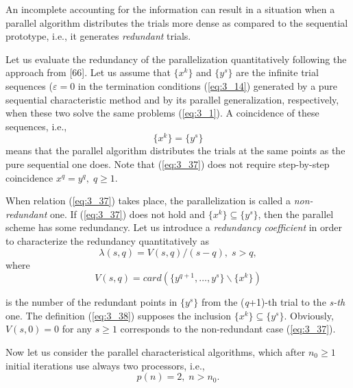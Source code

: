 	An incomplete accounting for the information can result in a situation when a parallel algorithm distributes the trials more dense as compared to the sequential prototype, i.e., it generates \textit{redundant} trials. 
	
	Let us evaluate the redundancy of the parallelization quantitatively following the approach from [66]. Let us assume that $\{ x^{k} \} $ and $\{ y^{s} \} $ are the infinite trial sequences ($\varepsilon =0$ in the termination conditions  (\ref{eq:3_14}) generated by a pure sequential characteristic method and by its parallel generalization, respectively, when these two solve the same problems  (\ref{eq:3_1}). A coincidence of these sequences, i.e.,
	\begin{equation} 
	\label{eq:3_37} 
	\{ x^{k} \} =\{ y^{s} \}  
	\end{equation} 
	means that the parallel algorithm distributes the trials at the same points as the pure sequential one does. Note that  (\ref{eq:3_37}) does not require  step-by-step coincidence $x^q =y^q ,\; q\ge 1$. 
	
	When relation  (\ref{eq:3_37}) takes place, the parallelization is called a \textit{non-redundant} one. If  (\ref{eq:3_37}) does not hold and $\{ x^{k} \} \subseteq \{ y^{s} \} $, then the parallel scheme has some redundancy. Let us introduce a \textit{redundancy coefficient} in order to characterize the redundancy quantitatively as
	\begin{equation}
	\label{eq:3_38}
	\lambda (s,q)=V(s,q)/(s-q),\; s>q,
	\end{equation}
	where
	\begin{equation*}
	V(s,q)=card(\{ y^{q+1} ,\ldots ,y^{s} \} \backslash \{ x^{k} \} )
	\end{equation*}
	
	is the number of the redundant points in $\{ y^{s} \} $ from the (\textit{q}+1)-th trial to the \textit{s-th} one. The definition  (\ref{eq:3_38}) supposes the inclusion $\{ x^k \} \subseteq \{ y^s \} $. Obviously, $V(s, 0)=0$ for any $s\ge 1$ corresponds to the non-redundant case  (\ref{eq:3_37}).
	
	Now let us consider the parallel characteristical algorithms, which after $n{}_{0} \ge 1$ initial  iterations use always two processors, i.e.,
	\begin{equation}
	\label{eq:3_39}
	p(n)=2,\; n>n_{0}.
	\end{equation}
	
